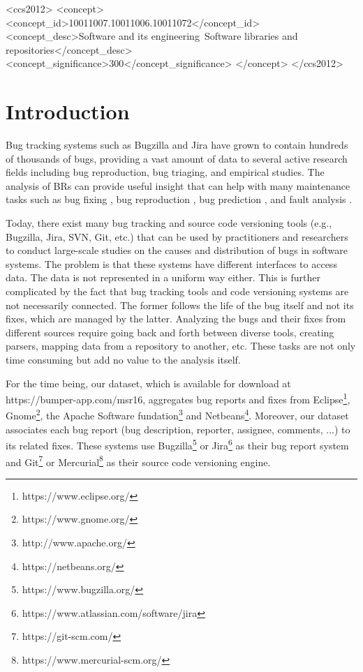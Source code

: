 \documentclass{sig-alternate-05-2015}
\begin{document}
\begin{CCSXML}
<ccs2012>
<concept>
<concept_id>10011007.10011006.10011072</concept_id>
<concept_desc>Software and its engineering~Software libraries and repositories</concept_desc>
<concept_significance>300</concept_significance>
</concept>
</ccs2012>
\end{CCSXML}


\printccsdesc



\section{Introduction}
\label{sec:Introduction}

Bug tracking systems such as Bugzilla and Jira have
grown to contain hundreds of thousands of bugs, providing
a vast amount of data to several active research fields
including bug reproduction, bug triaging, and empirical
studies. The analysis of BRs can provide useful insight that
can help with many maintenance tasks such as bug fixing
\cite{Weiß2007, Bhattacharya2011, Saha2014}, bug reproduction \cite{Artzi2008,Chen2013,Jin2012,Nayrolles2015}, bug prediction \cite{DAmbros2010, Kamei2010, Kim2011a}, and fault analysis \cite{Hamill2014}.

Today, there exist many bug tracking and source code
versioning tools (e.g., Bugzilla, Jira, SVN, Git, etc.) that
can be used by practitioners and researchers to conduct
large-scale studies on the causes and distribution of bugs in
software systems. The problem is that these systems have
different interfaces to access data. The data is not
represented in a uniform way either. This is further
complicated by the fact that bug tracking tools and code
versioning systems are not necessarily connected. The
former follows the life of the bug itself and not its fixes,
which are managed by the latter.
Analyzing the bugs and their fixes from different
sources require going back and forth between diverse tools,
creating parsers, mapping data from a repository to another,
etc. These tasks are not only time consuming but add no
value to the analysis itself.

For the time being, our dataset, which is available for download at
https://bumper-app.com/msr16, aggregates bug reports and fixes from
Eclipse\footnote{https://www.eclipse.org/}, Gnome\footnote{https://www.gnome.org/}, the Apache Software fundation\footnote{http://www.apache.org/} and Netbeans\footnote{https://netbeans.org/}.
Moreover, our dataset associates each bug report (bug description, reporter, assignee, comments, ...) to its related fixes.
These systems use Bugzilla\footnote{https://www.bugzilla.org/} or Jira\footnote{https://www.atlassian.com/software/jira} as their bug report system and Git\footnote{https://git-scm.com/} or Mercurial\footnote{https://www.mercurial-scm.org/} as their source code versioning engine.
\end{document}
